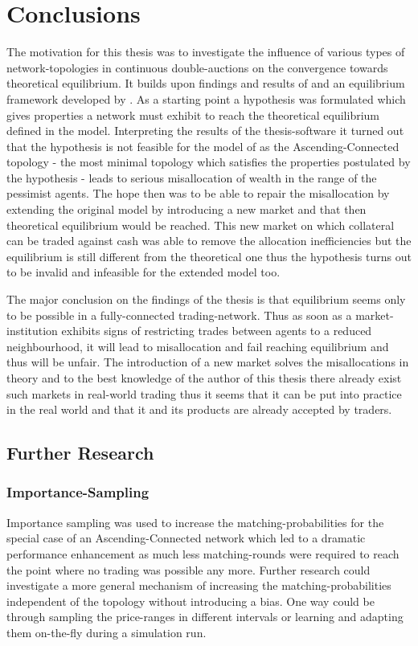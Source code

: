 \documentclass[Bachelorarbeit.tex]{subfiles}
\begin{document}
\chapter{Conclusions}
\label{ch:conclusions}

The motivation for this thesis was to investigate the influence of various types of network-topologies in continuous double-auctions on the convergence towards theoretical equilibrium. It builds upon findings and results of \cite{Breuer2015} and an equilibrium framework developed by \cite{Geanakoplos2009}. As a starting point a hypothesis was formulated which gives properties a network must exhibit to reach the theoretical equilibrium defined in the model. Interpreting the results of the thesis-software it turned out that the hypothesis is not feasible for the model of \cite{Breuer2015} as the Ascending-Connected topology - the most minimal topology which satisfies the properties postulated by the hypothesis - leads to serious misallocation of wealth in the range of the pessimist agents. The hope then was to be able to repair the misallocation by extending the original model by introducing a new market and that then theoretical equilibrium would be reached. This new market on which collateral can be traded against cash was able to remove the allocation inefficiencies but the equilibrium is still different from the theoretical one thus the hypothesis turns out to be invalid and infeasible for the extended model too.

\bigskip

The major conclusion on the findings of the thesis is that equilibrium seems only to be possible in a fully-connected trading-network. Thus as soon as a market-institution exhibits signs of restricting trades between agents to a reduced neighbourhood, it will lead to misallocation and fail reaching equilibrium and thus will be unfair. The introduction of a new market solves the misallocations in theory and to the best knowledge of the author of this thesis there already exist such markets in real-world trading thus it seems that it can be put into practice in the real world and that it and its products are already accepted by traders.

\section*{Further Research}

\subsection*{Importance-Sampling}
Importance sampling was used to increase the matching-probabilities for the special case of an Ascending-Connected network which led to a dramatic performance enhancement as much less matching-rounds were required to reach the point where no trading was possible any more. Further research could investigate a more general mechanism of increasing the matching-probabilities independent of the topology without introducing a bias. One way could be through sampling the price-ranges in different intervals or learning and adapting them on-the-fly during a simulation run.
\end{document}
